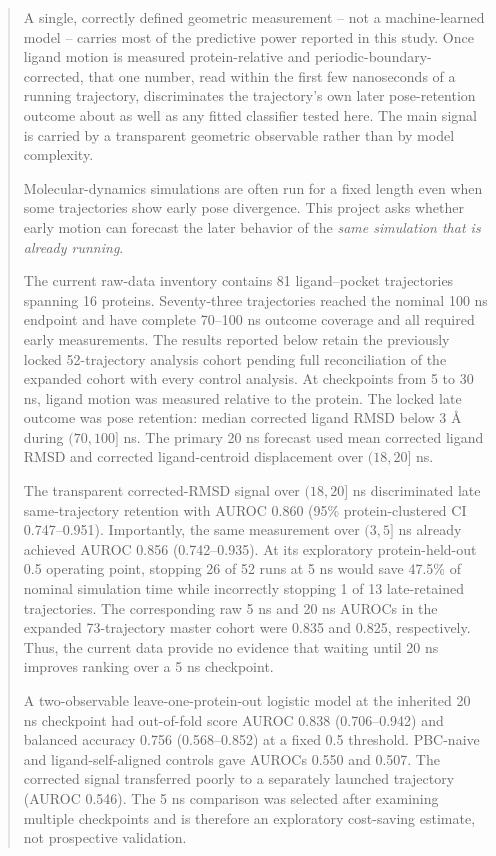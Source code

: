 \documentclass[11pt]{article}
\begin{document}
\begin{abstract}
A single, correctly defined geometric measurement -- not a machine-learned model -- carries most of the predictive power reported in this study. Once ligand motion is measured protein-relative and periodic-boundary-corrected, that one number, read within the first few nanoseconds of a running trajectory, discriminates the trajectory's own later pose-retention outcome about as well as any fitted classifier tested here. The main signal is carried by a transparent geometric observable rather than by model complexity.

Molecular-dynamics simulations are often run for a fixed length even when some trajectories show early pose divergence. This project asks whether early motion can forecast the later behavior of the \emph{same simulation that is already running}.

The current raw-data inventory contains 81 ligand--pocket trajectories spanning 16 proteins. Seventy-three trajectories reached the nominal 100 ns endpoint and have complete 70--100 ns outcome coverage and all required early measurements. The results reported below retain the previously locked 52-trajectory analysis cohort pending full reconciliation of the expanded cohort with every control analysis. At checkpoints from 5 to 30 ns, ligand motion was measured relative to the protein. The locked late outcome was pose retention: median corrected ligand RMSD below 3 \AA{} during $(70,100]$ ns. The primary 20 ns forecast used mean corrected ligand RMSD and corrected ligand-centroid displacement over $(18,20]$ ns.

The transparent corrected-RMSD signal over $(18,20]$ ns discriminated late same-trajectory retention with AUROC 0.860 (95\% protein-clustered CI 0.747--0.951). Importantly, the same measurement over $(3,5]$ ns already achieved AUROC 0.856 (0.742--0.935). At its exploratory protein-held-out 0.5 operating point, stopping 26 of 52 runs at 5 ns would save 47.5\% of nominal simulation time while incorrectly stopping 1 of 13 late-retained trajectories. The corresponding raw 5 ns and 20 ns AUROCs in the expanded 73-trajectory master cohort were 0.835 and 0.825, respectively. Thus, the current data provide no evidence that waiting until 20 ns improves ranking over a 5 ns checkpoint.

A two-observable leave-one-protein-out logistic model at the inherited 20 ns checkpoint had out-of-fold score AUROC 0.838 (0.706--0.942) and balanced accuracy 0.756 (0.568--0.852) at a fixed 0.5 threshold. PBC-naive and ligand-self-aligned controls gave AUROCs 0.550 and 0.507. The corrected signal transferred poorly to a separately launched trajectory (AUROC 0.546). The 5 ns comparison was selected after examining multiple checkpoints and is therefore an exploratory cost-saving estimate, not prospective validation.


\end{abstract}
\end{document}
